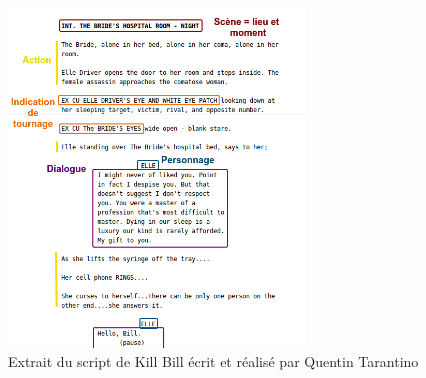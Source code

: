 \begin{figure}[ht!]
\centering
\includegraphics[width=0.7\textwidth]{images/ScriptExample-v1.png}
\caption{Extrait du script de Kill Bill écrit et réalisé par Quentin Tarantino}
\label{img:intro:script} 
\end{figure}


